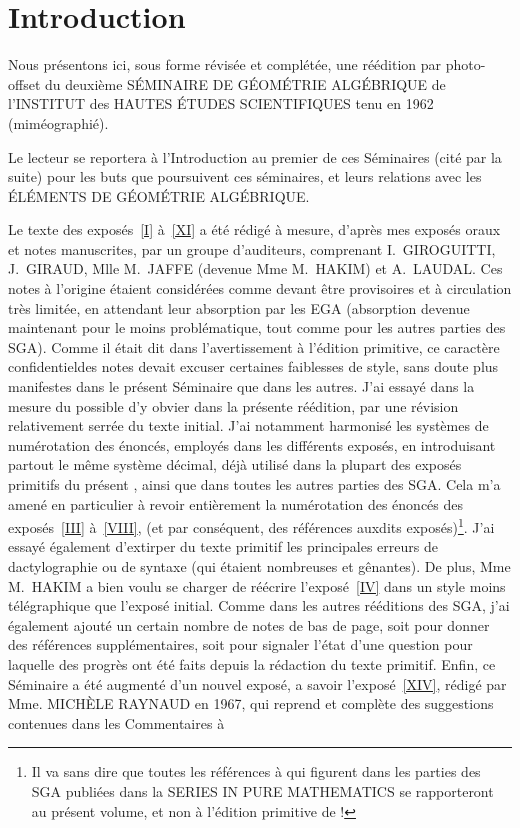 \chapter*{Introduction} \label{I.0}

Nous pr\'esentons ici, sous forme r\'evis\'ee et compl\'et\'ee, une r\'e\'edition par photo-offset du deuxi\`eme S\'EMINAIRE DE G\'{E}OM\'{E}TRIE ALG\'EBRIQUE de l'INSTITUT des HAUTES \'ETUDES SCIENTIFIQUES tenu en 1962 (mim\'eographi\'e).

Le lecteur se reportera \`a l'Introduction au premier de ces S\'eminaires (cit\'e  par la suite) pour les buts que poursuivent ces s\'eminaires, et leurs relations avec les \'EL\'EMENTS DE G\'{E}OM\'{E}TRIE ALG\'EBRIQUE.

Le texte des expos\'es~\ref{I} \`a~\ref{XI} a \'et\'e r\'edig\'e \`a mesure, d'apr\`es mes expos\'es oraux et notes manuscrites, par un groupe d'auditeurs, comprenant I.\, GIROGUITTI, J.\, GIRAUD, Mlle M.\, JAFFE (devenue Mme M.\, HAKIM) et A.\, LAUDAL. Ces notes \`a l'origine \'etaient consid\'er\'ees comme devant \^etre provisoires et \`a circulation tr\`es limit\'ee, en attendant leur absorption par les EGA (absorption devenue maintenant pour le moins probl\'ematique, tout comme pour les autres parties des SGA). Comme il \'etait dit dans l'avertissement \`a l'\'edition primitive, ce caract\`ere \og confidentiel\fg des notes devait excuser certaines \og faiblesses de style\fg, sans doute plus manifestes dans le pr\'esent S\'eminaire  que dans les autres. J'ai essay\'e dans la mesure du possible d'y obvier dans la pr\'esente r\'e\'edition, par une r\'evision relativement serr\'ee du texte initial. J'ai notamment harmonis\'e les syst\`emes de num\'erotation des \'enonc\'es, employ\'es dans les diff\'erents expos\'es, en introduisant partout le m\^eme syst\`eme d\'ecimal, d\'ej\`a utilis\'e dans la plupart des expos\'es primitifs du pr\'esent , ainsi que dans toutes les autres parties des SGA. Cela m'a amen\'e en particulier \`a revoir enti\`erement la num\'erotation des \'enonc\'es des expos\'es~\ref{III} \`a~\ref{VIII}, (et par cons\'equent, des r\'ef\'erences auxdits expos\'es)\footnote{Il va sans dire que toutes les r\'ef\'erences \`a  qui figurent dans les parties des SGA publi\'ees dans la SERIES IN PURE MATHEMATICS se rapporteront au pr\'esent volume, et non \`a l'\'edition primitive de  !}. J'ai essay\'e \'egalement d'extirper du texte primitif les principales erreurs de dactylographie ou de syntaxe (qui \'etaient nombreuses et g\^enantes). De plus, Mme M.\, HAKIM a bien voulu se charger de r\'e\'ecrire l'expos\'e~\ref{IV} dans un style moins t\'el\'egraphique que l'expos\'e initial. Comme dans les autres r\'e\'editions des SGA, j'ai \'egalement ajout\'e un certain nombre de notes de bas de page, soit pour donner des r\'ef\'erences suppl\'ementaires, soit pour signaler l'\'etat d'une question pour laquelle des progr\`es ont \'et\'e faits depuis la r\'edaction du texte primitif. Enfin, ce S\'eminaire a \'et\'e augment\'e d'un nouvel expos\'e, a savoir l'expos\'e~\ref{XIV}, r\'edig\'e par Mme. MICH\`ELE RAYNAUD en 1967, qui reprend et compl\`ete des suggestions contenues dans les \og Commentaires \`a 